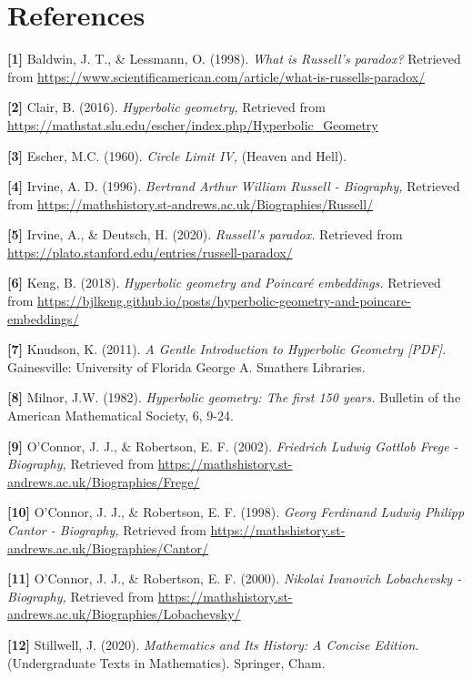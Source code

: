 \documentclass[12pt]{article}
\begin{document}
\section{References}

\textbf{[1]}
Baldwin, J. T., \& Lessmann, O. (1998). \textit{What is Russell's paradox?} Retrieved from \url{https://www.scientificamerican.com/article/what-is-russells-paradox/}

\textbf{[2]}
Clair, B. (2016). \textit{Hyperbolic geometry,} Retrieved from \url{https://mathstat.slu.edu/escher/index.php/Hyperbolic_Geometry}

\textbf{[3]}
Escher, M.C. (1960). \textit{Circle Limit IV,} (Heaven and Hell).

\textbf{[4]}
Irvine, A. D. (1996). \textit{Bertrand Arthur William Russell - Biography,} Retrieved from \url{https://mathshistory.st-andrews.ac.uk/Biographies/Russell/}

\textbf{[5]}
Irvine, A., \& Deutsch, H. (2020). \textit{Russell's paradox.} Retrieved from \url{https://plato.stanford.edu/entries/russell-paradox/}

\textbf{[6]}
Keng, B. (2018). \textit{Hyperbolic geometry and Poincaré embeddings.} Retrieved from \url{https://bjlkeng.github.io/posts/hyperbolic-geometry-and-poincare-embeddings/}

\textbf{[7]}
Knudson, K. (2011). \textit{A Gentle Introduction to Hyperbolic Geometry [PDF].} Gainesville: University of Florida George A. Smathers Libraries.

\textbf{[8]}
Milnor, J.W. (1982). \textit{Hyperbolic geometry: The first 150 years.} Bulletin of the American Mathematical Society, 6, 9-24.

\textbf{[9]}
O'Connor, J. J., \& Robertson, E. F. (2002). \textit{Friedrich Ludwig Gottlob Frege - Biography,} Retrieved from \url{https://mathshistory.st-andrews.ac.uk/Biographies/Frege/}

\textbf{[10]}
O'Connor, J. J., \& Robertson, E. F. (1998). \textit{Georg Ferdinand Ludwig Philipp Cantor - Biography,} Retrieved from \url{https://mathshistory.st-andrews.ac.uk/Biographies/Cantor/}

\textbf{[11]}
O'Connor, J. J., \& Robertson, E. F. (2000). \textit{Nikolai Ivanovich Lobachevsky - Biography,} Retrieved from \url{https://mathshistory.st-andrews.ac.uk/Biographies/Lobachevsky/}

\textbf{[12]}
Stillwell, J. (2020). \textit{Mathematics and Its History: A Concise Edition.} (Undergraduate Texts in Mathematics). Springer, Cham.
\end{document}
